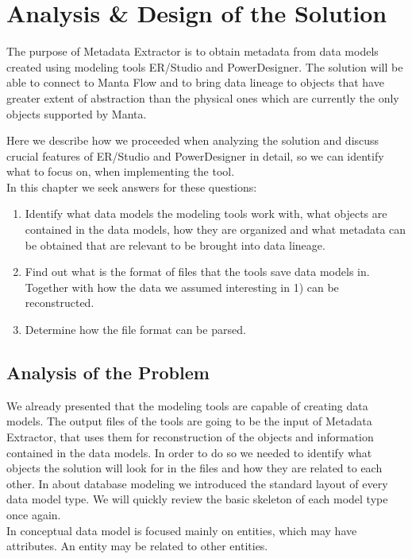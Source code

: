 \chapter{Analysis \& Design of the Solution}

The purpose of Metadata Extractor is to obtain metadata from data models created using modeling tools ER/Studio and PowerDesigner. The solution will be able to connect to Manta Flow and to bring data lineage to objects that have greater extent of abstraction than the physical ones which are currently the only objects supported by Manta.

Here we describe how we proceeded when analyzing the solution and discuss crucial features of ER/Studio and PowerDesigner in detail, so we can identify what to focus on, when implementing the tool.\\

In this chapter we seek answers for these questions:
\begin{enumerate}
	\item Identify what data models the modeling tools work with, what objects are contained in the data models, how they are organized and what metadata can be obtained that are relevant to be brought into data lineage.
	\item Find out what is the format of files that the tools save data models in. Together with how the data we assumed interesting in 1) can be reconstructed.
	\item Determine how the file format can be parsed.
\end{enumerate}

\section{Analysis of the Problem}

We already presented that the modeling tools are capable of creating data models. The output files of the tools are going to be the input of Metadata Extractor, that uses them for reconstruction of the objects and information contained in the data models.
In order to do so we needed to identify what objects the solution will look for in the files and how they are related to each other.
In  about database modeling we introduced the standard layout of every data model type. We will quickly review the basic skeleton of each model type once again. \\

In conceptual data model is focused mainly on entities, which may have attributes. An entity may be related to other entities.

